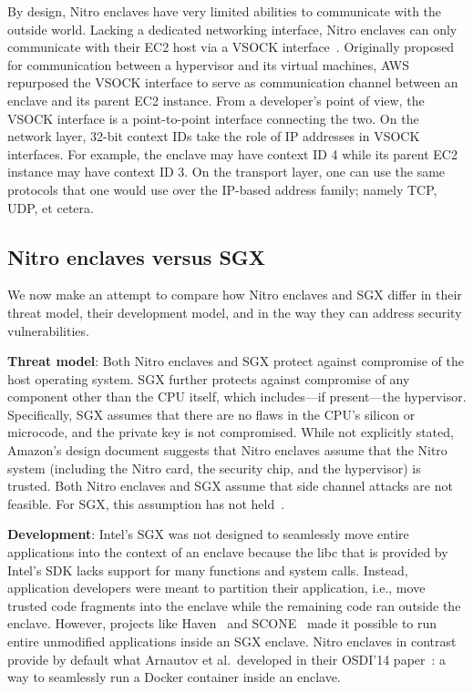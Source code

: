 By design, Nitro enclaves have very limited abilities to communicate with the
outside world.  Lacking a dedicated networking interface, Nitro enclaves can
only communicate with their EC2 host via a VSOCK interface~\cite{vsock}.
Originally proposed for communication between a hypervisor and its virtual
machines, AWS repurposed the VSOCK interface to serve as communication channel
between an enclave and its parent EC2 instance.  From a developer's point of
view, the VSOCK interface is a point-to-point interface connecting the two.  On
the network layer, 32-bit context IDs take the role of IP addresses in VSOCK
interfaces.  For example, the enclave may have context ID 4 while its parent EC2
instance may have context ID 3.  On the transport layer, one can use the same
protocols that one would use over the IP-based address family; namely TCP, UDP,
et cetera.

\subsection{Nitro enclaves versus SGX}%
\label{sec:comparison}

We now make an attempt to compare how Nitro enclaves and SGX differ in their
threat model, their development model, and in the way they can address security
vulnerabilities.

\textbf{Threat model}:
Both Nitro enclaves and SGX protect against compromise of the host operating
system.  SGX further protects against compromise of any component other than the
CPU itself, which includes---if present---the hypervisor.  Specifically, SGX
assumes that there are no flaws in the CPU's silicon or microcode, and the
private key is not compromised.  While not explicitly stated, Amazon's design
document suggests that Nitro enclaves assume that the Nitro system (including
the Nitro card, the security chip, and the hypervisor) is trusted.  Both Nitro
enclaves and SGX assume that side channel attacks are not feasible.  For SGX,
this assumption has not held~\cite{Nilsson20a,Fei2021a}.

\textbf{Development}:
Intel's SGX was not designed to seamlessly move entire applications into the
context of an enclave because the libc that is provided by Intel's SDK lacks
support for many functions and system calls.  Instead, application developers
were meant to partition their application, i.e., move trusted code fragments
into the enclave while the remaining code ran outside the enclave.  However,
projects like Haven~\cite{Baumann2014a} and SCONE~\cite{Arnautov2016a} made it
possible to run entire unmodified applications inside an SGX enclave.  Nitro
enclaves in contrast provide by default what Arnautov et al.\ developed in their
OSDI'14 paper~\cite{Arnautov2016a}: a way to seamlessly run a Docker container
inside an enclave.

